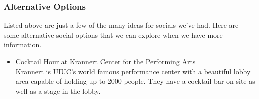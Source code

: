\subsubsection{Alternative Options}

Listed above are just a few of the many ideas for socials we've had. Here are some alternative social options that we can explore when we have more information. 

\begin{itemize}
	\item Cocktail Hour at Krannert Center for the Performing Arts\\
	Krannert is UIUC's world famous performance center with a beautiful lobby area capable of holding up to 2000 people. They have a cocktail bar on site as well as a stage in the lobby.
\end{itemize}

